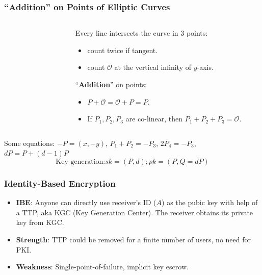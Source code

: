 \begin{frame}\frametitle{``Addition'' on Points of Elliptic Curves}
\begin{columns}
\begin{column}{5cm}
\begin{figure}
\begin{center}

\end{center}
\end{figure}
\end{column}
\begin{column}{5cm}
Every line intersects the curve in 3 points:
\begin{itemize}
\item count twice if tangent.
\item count $\mathcal{O}$ at the vertical infinity of $y$-axis.
\end{itemize}
``\textbf{Addition}'' on points:
\begin{itemize}
\item $P+\mathcal{O} = \mathcal{O} + P = P$.
\item If $P_1, P_2, P_3$ are co-linear, then $P_1 + P_2 + P_3 = \mathcal{O}$.
\end{itemize}
\end{column}
\end{columns}
Some equations: \newline
$-P=(x,-y)$, $P_1 + P_2 = -P_3$, $2P_4=-P_3$, $dP = P + (d-1)P$
\[\text{Key generation:} sk = (P,d); pk = (P,Q=dP)\]
\end{frame}
\begin{frame}\frametitle{Identity-Based Encryption}
\begin{itemize}
\item \textbf{IBE}: Anyone can directly use receiver's ID ($A$) as the pubic key with help of a TTP, aka KGC (Key Generation Center). The receiver obtains its private key from KGC.
\item \textbf{Strength}: TTP could be removed for a finite number of users, no need for PKI.
\item \textbf{Weakness}: Single-point-of-failure, implicit key escrow.
\end{itemize}
\begin{figure}
\begin{center}

\end{center}
\end{figure}
\end{frame}
